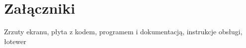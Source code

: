 

\chapter{Załączniki}
Zrzuty ekranu, płyta z kodem, programem i dokumentacją,
instrukcje obsługi, łotewer